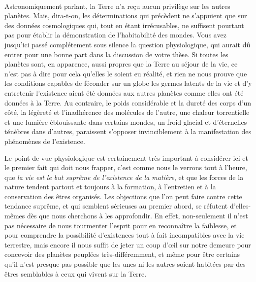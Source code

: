 \documentclass[a4paper, 11pt, oneside, landscape]{article}
\begin{document}
\paragraph{}
Astronomiquement parlant, la Terre n'a reçu aucun privilège sur les autres planètes. Mais, dira-t-on, les déterminations qui précèdent ne s'appuient que sur des données cosmologiques qui, tout en étant irrécusables, ne suffisent pourtant pas pour établir la démonstration de l'habitabilité des mondes. Vous avez jusqu'ici passé complétement sous silence la question physiologique, qui aurait dû entrer pour une bonne part dans la discussion de votre thèse. Si toutes les planètes sont, en apparence, aussi propres que la Terre au séjour de la vie, ce n'est pas à dire pour cela qu'elles le soient eu réalité, et rien ne nous prouve que les conditions capables de féconder sur un globe les germes latents de la vie et d'y entretenir l'existence aient été données aux autres planètes comme elles ont été données à la Terre. Au contraire, le poids considérable et la dureté des corps d'un côté, la légèreté et l'inadhérence des molécules de l'autre, une chaleur torrentielle et une lumière éblouissante dans certains mondes, un froid glacial et d'éternelles ténèbres dans d'autres, paraissent s'opposer invinciblement à la manifestation des phénomènes de l'existence.

Le point de vue physiologique est certainement très-important à considérer ici et le premier fait qui doit nous frapper, c'est comme nous le verrons tout à l'heure, que \emph{la vie est le but suprême de l'existence de la matière}, et que les forces de la nature tendent partout et toujours à la formation, à l'entretien et à la conservation des êtres organisés. Les objections que l'on peut faire contre cette tendance suprême, et qui semblent sérieuses au premier abord, se réfutent d'elles-mêmes dès que nous cherchons à les approfondir. En effet, non-seulement il n'est pas nécessaire de nous tourmenter l'esprit pour en reconnaître la faiblesse, et pour comprendre la possibilité d'existences tout à fait incompatibles avec la vie terrestre, mais encore il nous suffit de jeter un coup d'œil sur notre demeure pour concevoir des planètes peuplées très-différemment, et même pour être certains qu'il n'est presque pas possible que les unes ni les autres soient habitées par des êtres semblables à ceux qui vivent sur la Terre.
\end{document}
